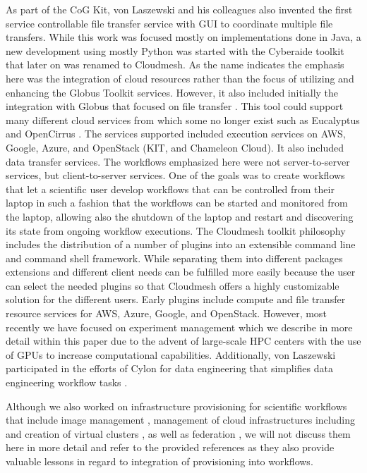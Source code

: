 As part of the CoG Kit, von Laszewski and his colleagues also invented the first service controllable file transfer service with GUI to coordinate multiple file transfers. While this work was focused mostly on implementations done in Java, a new development using mostly Python was started with the Cyberaide toolkit \citep{las-09-ccgrid} that later on was renamed to Cloudmesh. As the name indicates the emphasis here was the integration of cloud resources rather than the focus of utilizing and enhancing the Globus Toolkit services. However, it also included initially the integration with Globus that focused on file transfer 
\citep{las-04-ftp-journal}
\citep{las-03-ftp}.
This tool could support many different cloud services from which some no longer exist such as Eucalyptus \cite{eucalyptus} and OpenCirrus \cite{opencirrus}. The services supported included execution services on AWS, Google, Azure, and OpenStack (KIT, and Chameleon Cloud). It also included data transfer services. The workflows emphasized here were not server-to-server services, but client-to-server services. One of the goals was to create workflows that let a scientific user develop workflows that can be controlled from their laptop in such a fashion that the workflows can be started and monitored from the laptop, allowing also the shutdown of the laptop and restart and discovering its state from ongoing workflow executions. 
The Cloudmesh toolkit \citep{las-17-cloudmesh} philosophy includes the distribution of a number of plugins into an extensible command line and command shell framework. While separating them into different packages extensions and different client needs can be fulfilled more easily because the user can select the needed plugins so that Cloudmesh offers a highly customizable solution for the different users. Early plugins include compute and file transfer resource services for AWS, Azure, Google, and OpenStack. However, most recently we have focused on experiment management which we describe in more detail within this paper due to the advent of large-scale HPC centers with the use of GPUs to increase computational capabilities. 
Additionally, von Laszewski participated in the efforts of Cylon for data engineering that simplifies data engineering workflow tasks \citep{cylon,cylon-radical}. 

Although we also worked on infrastructure provisioning for scientific
workflows that include image management
\citep{las-12-imagemanagement}, management of cloud infrastructures
including \citep{las-20-10gce,las-14-bigdata,las-12-fg-bookchapter}
\citep{las-17-futuregrid} and creation of virtual clusters
\citep{las-16-virtcluster,las-19-harc-comet}, as well as federation
\citep{las-08-federated-cloud}, we will not discuss them here in more
detail and refer to the provided references as they also provide
valuable lessons in regard to integration of provisioning into
workflows.


